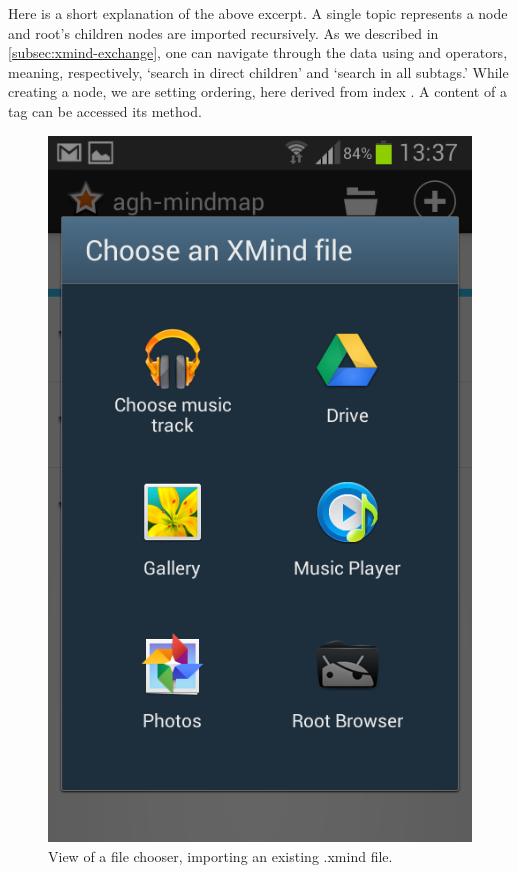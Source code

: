 Here is a short explanation of the above excerpt. A single topic represents a node and root's children nodes are imported recursively. As we described in \cref{subsec:xmind-exchange}, one can navigate through the data using \inlinecode{\textbackslash} and \inlinecode{\textbackslash\textbackslash} operators, meaning, respectively, `search in direct children' and `search in all subtags.' While creating a node, we are setting ordering, here derived from index . A content of a tag can be accessed its  method.

\begin{figure}[h]
	\centering
	\includegraphics[width=.5\textwidth]{graphics-screenshot-import}
	\caption{View of a file chooser, importing an existing .xmind file.}
	\label{fig:screen-filechooser}
\end{figure}
